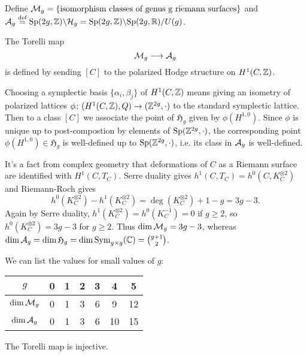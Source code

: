 \documentclass[../main.tex]{subfiles}
\begin{document}
Define $\mathcal{M}_g= \left\{ \text{isomorphism classes of genus g riemann surfaces} \right\}$ and $\mathcal{A}_g \stackrel{\text{def}}{=} \mathrm{Sp}(2g, \mathbb{Z}) \backslash \mathcal{H}_g = \mathrm{Sp}(2g, \mathbb{Z}) \backslash  \mathrm{Sp}(2g, \mathbb{R}) /U(g)$.
\begin{defn}
    The Torelli map 
    \[
    \mathcal{M}_g \longrightarrow \mathcal{A}_g
    \]
    is defined by sending $[C]$ to the polarized Hodge structure on $H^1(C, \mathbb{Z})$. 
\end{defn}
Choosing a symplectic basis $\{\alpha_i,\beta_j\}$ of $H^1(C, \mathbb{Z})$ means giving an isometry of polarized lattices $\phi \colon (H^1(C, \mathbb{Z}), Q) \to (\mathbb{Z}^{2g}, \cdot)$ to the standard symplectic lattice. Then to a class $[C]$ we associate the point of $\mathfrak{H}_g$ given by $\phi(H^{1,0})$. Since $\phi$ is unique up to post-compostion by elements of $\mathrm{Sp}(\mathbb{Z}^{2g}, \cdot)$, the corresponding point $\phi(H^{1,0}) \in \mathfrak{H}_g$ is well-defined up to  $\mathrm{Sp}(\mathbb{Z}^{2g}, \cdot)$, i.e. its class in $\mathcal{A}_g$ is well-defined.

It’s a fact from complex geometry that deformations of $C$ as a Riemann surface are identified with $H^1(C, T_C)$. Serre duality gives $h^1(C, T_C) = h^0(C, K^{\otimes2}_C)$ and Riemann-Roch gives
\[
h^0(K^{\otimes2}_C) - h^1(K^{\otimes2}_C) = \deg (K^{\otimes2}_C) + 1 - g = 3g - 3.
\]
Again by Serre duality, $h^1(K^{\otimes2}_C) = h^0(K^{-1}_C) = 0$ if $g \geq 2$, so $h^0(K^{\otimes2}_C) = 3g - 3$ for $g \geq 2$. Thus $\dim \mathcal{M}_g = 3g - 3$, whereas $\dim \mathcal{A}_g = \dim \mathfrak{H}_g = \dim \operatorname{Sym}_{g\times g}(\mathbb{C}) = {g+1\choose 2}$.

We can list the values for small values of $g$:

\begin{center}
    
\begin{tabular}{c|c|c|c|c|c|c}
        $g$       &  0   &  1   &  2   &  3  &  4  &  5  \\ \hline
   $\dim \mathcal{M}_g$ &  0   &  1   &  3   &  6  &  9  &  12 \\ \hline
   $\dim \mathcal{A}_g$ &  0   &  1   &  3   &  6  &  10 &  15 \\
\end{tabular}
\end{center}

\begin{theorem} \textup{\cite[Thm. 3.5.2]{CMSP03}} \label{Torelli}


    The Torelli map is injective.
\end{theorem}
\end{document}
